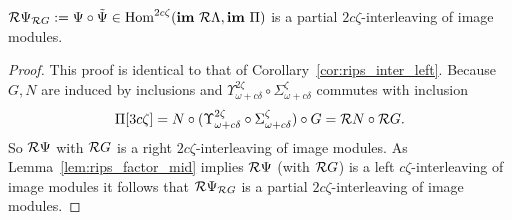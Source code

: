 \begin{corollary}\label{cor:rips_inter_right}
  $\mathcal{R} \Psi_{\mathcal{R} G} := \Psi\circ\tilde{\Psi}\in\mathrm{Hom}^{2c\zeta}(\mathbf{im}~\mathcal{R}\Lambda, \mathbf{im}~\Pi)$ is a partial $2c\zeta$-interleaving of image modules.
\end{corollary}
\begin{proof}
  This proof is identical to that of Corollary~\ref{cor:rips_inter_left}.
  Because $G,N$ are induced by inclusions and $\Upsilon_{\omega+c\delta}^{2\zeta}\circ \Sigma_{\omega+c\delta}^{\zeta}$ commutes with inclusion
  \[\Pi[3c\zeta] = N\circ (\Upsilon_{\omega+c\delta}^{2\zeta}\circ \Sigma_{\omega+c\delta}^{\zeta})\circ G = \mathcal{R} N\circ \mathcal{R} G.\]
  So $\mathcal{R}\Psi$ with $\mathcal{R} G$ is a right $2c\zeta$-interleaving of image modules.
  As Lemma~\ref{lem:rips_factor_mid} implies $\mathcal{R} \Psi$ (with $\mathcal{R} G$) is a left $c\zeta$-interleaving of image modules it follows that $\mathcal{R} \Psi_{\mathcal{R} G}$ is a partial $2c\zeta$-interleaving of image modules.
\end{proof}
%
%

